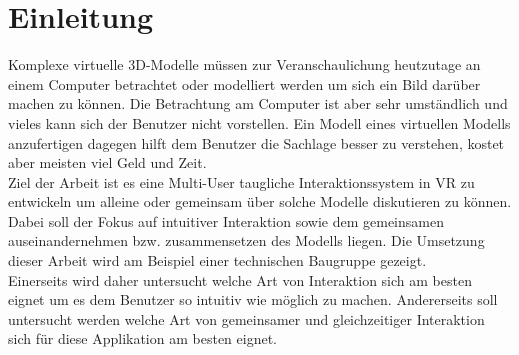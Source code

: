 \chapter{Einleitung}
\label{ch:Einleitung}


Komplexe virtuelle 3D-Modelle müssen zur Veranschaulichung heutzutage an einem Computer betrachtet oder modelliert werden um sich ein Bild darüber machen zu können. Die Betrachtung am Computer ist aber sehr umständlich und vieles kann sich der Benutzer nicht vorstellen. Ein Modell eines virtuellen Modells anzufertigen dagegen hilft dem Benutzer die Sachlage besser zu verstehen, kostet aber meisten viel Geld und Zeit. \\

\noindent Ziel der Arbeit ist es eine Multi-User taugliche Interaktionssystem in VR zu entwickeln um alleine oder gemeinsam über solche Modelle diskutieren zu können. Dabei soll der Fokus auf intuitiver Interaktion sowie dem gemeinsamen auseinandernehmen bzw. zusammensetzen des Modells liegen. Die Umsetzung dieser Arbeit wird am Beispiel einer technischen Baugruppe gezeigt. \\

\noindent Einerseits wird daher untersucht welche Art von Interaktion sich am besten eignet um es dem Benutzer so intuitiv wie möglich zu machen. Andererseits soll untersucht werden welche Art von gemeinsamer und gleichzeitiger Interaktion sich für diese Applikation am besten eignet.